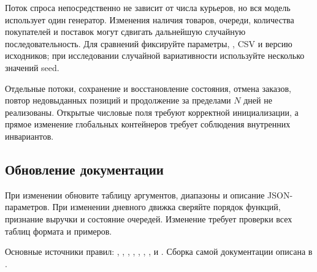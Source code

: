 Поток спроса непосредственно не зависит от числа курьеров, но вся модель
использует один генератор. Изменения наличия товаров, очереди, количества
покупателей и поставок могут сдвигать дальнейшую случайную последовательность.
Для сравнений фиксируйте параметры, , CSV и версию исходников;
при исследовании случайной вариативности используйте несколько значений seed.

Отдельные потоки, сохранение и восстановление состояния, отмена заказов,
повтор недовыданных позиций и продолжение за пределами $N$ дней не реализованы.
Открытые числовые поля требуют корректной инициализации, а прямое изменение
глобальных контейнеров требует соблюдения внутренних инвариантов.

\subsection{Обновление документации}
При изменении  обновите таблицу аргументов,
диапазоны и описание JSON-параметров. При изменении дневного движка сверяйте
порядок функций, признание выручки и состояние очередей. Изменение
 требует проверки всех таблиц формата и примеров.

Основные источники правил: ,
, ,
, ,
, ,  и .
Сборка самой документации описана в .
